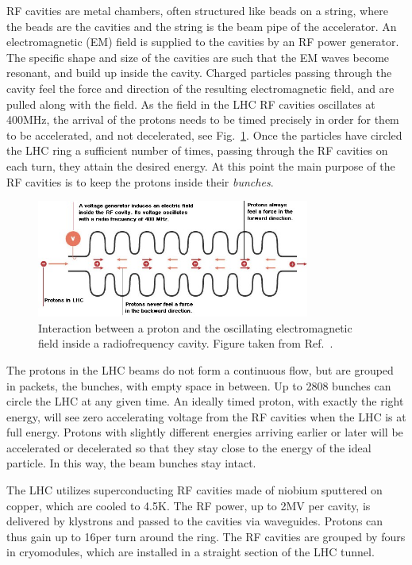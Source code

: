 RF cavities are metal chambers, often structured like beads on a string, where the beads are the
cavities and the string is the beam pipe of the accelerator.
An electromagnetic (EM) field is supplied to the cavities by an RF power generator. The specific
shape and size of the cavities are such that the EM waves become resonant, and build up inside the
cavity. 
Charged particles passing through the cavity feel the force and direction of the resulting
electromagnetic field, and are pulled along with the field. 
As the field in the LHC RF cavities oscillates at 400\unit{MHz}, the arrival of the protons needs to
be timed precisely in order for them to be accelerated, and not decelerated, see 
Fig.~\ref{fig:RF_explanation}. 
Once the particles have circled the LHC ring a sufficient number of times, passing through
the RF cavities on each turn, they attain the desired energy. At this point the main purpose of the
RF cavities is to keep the protons inside their \textit{bunches}. 

\begin{figure}[tpb]
  \centering
  \includegraphics[width=0.8\textwidth]{figures/lhc/RF_explanation}
  \caption{Interaction between a proton and the oscillating electromagnetic field inside a
radiofrequency cavity. Figure taken from Ref.~\cite{RF_explanation}.
  \label{fig:RF_explanation}}
\end{figure}

The protons in the LHC beams do not form a continuous flow, but are grouped in packets, the bunches,
with empty space in between. Up to 2808 bunches can circle the LHC at any
given time. An ideally timed proton, with exactly the right energy, will see zero
accelerating voltage from the RF cavities when the LHC is at full energy. Protons with slightly
different energies arriving earlier or later will be accelerated or decelerated so that they stay
close to the energy of the ideal particle. In this way, the beam bunches stay intact. 

The LHC utilizes superconducting RF cavities made of niobium sputtered on copper, which are
cooled to 4.5\unit{K}. The RF power, up to 2\unit{MV} per cavity, is delivered by klystrons and
passed to the cavities via waveguides. Protons can thus gain up to 16\MeV per turn around the ring.
The RF cavities are grouped by fours in cryomodules, which are installed in a straight section of
the LHC tunnel. 



